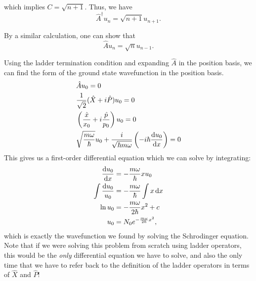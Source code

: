 \documentclass[../quantum_mechanics.tex]{subfiles}
\begin{document}
            which implies $C=\sqrt{n+1}$.
            Thus, we have
            \begin{equation}\label{eq:qho-ladder-raising-normalised}
                \hat{A}^\dagger u_n=\sqrt{n+1}u_{n+1}.
            \end{equation}

            By a similar calculation, one can show that
            \begin{equation}
                \hat{A} u_n=\sqrt{n}u_{n-1}.
            \end{equation}

            Using the ladder termination condition and expanding $\hat{A}$ in the position basis, we can find the form of the ground state wavefunction in the position basis.
            \begin{align}
                &\hat{A}u_0=0\\
                &\frac{1}{\sqrt{2}}(\hat{X}+i\hat{P})u_0=0\\
                &\left(\frac{\hat{x}}{x_0}+i\frac{\hat{p}}{p_0}\right)u_0=0\\
                &\sqrt{\frac{m\omega}{\hbar}}u_0+\frac{i}{\sqrt{\hbar m\omega}}\left(-i\hbar\dv{u_0}{x}\right)=0
            \end{align}
            This gives us a first-order differential equation which we can solve by integrating:
            \begin{align}
                \dv{u_0}{x}&=-\frac{m\omega}{\hbar}xu_0\\
                \int\frac{\dd{u_0}}{u_0}&=-\frac{m\omega}{\hbar}\int x\dd{x}\\
                \ln u_0&=-\frac{m\omega}{2\hbar}x^2+c\\
                u_0&=N_0e^{-\frac{m\omega}{2\hbar}x^2},
            \end{align}
            which is exactly the wavefunction we found by solving the Schrodinger equation.
            Note that if we were solving this problem from scratch using ladder operators, this would be the \textit{only} differential equation we have to solve, and also the only time that we have to refer back to the definition of the ladder operators in terms of $\hat{X}$ and $\hat{P}$!
\end{document}
